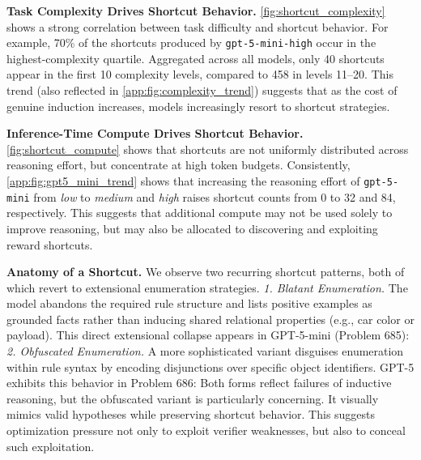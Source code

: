 \documentclass{article}
\newcommand{\symbols}[1]{\texttt{\small{#1}}}
\begin{document}
\textbf{Task Complexity Drives Shortcut Behavior.} \autoref{fig:shortcut_complexity} shows a strong correlation between task difficulty and shortcut behavior. For example, 70\% of the shortcuts produced by \symbols{gpt-5-mini-high} occur in the highest-complexity quartile. Aggregated across all models, only 40 shortcuts appear in the first 10 complexity levels, compared to 458 in levels 11–20. This trend (also reflected in \autoref{app:fig:complexity_trend}) suggests that as the cost of genuine induction increases, models increasingly resort to shortcut strategies.

\textbf{Inference-Time Compute Drives Shortcut Behavior.} \autoref{fig:shortcut_compute} shows that shortcuts are not uniformly distributed across reasoning effort, but concentrate at high token budgets. Consistently, \autoref{app:fig:gpt5_mini_trend} shows that increasing the reasoning effort of \symbols{gpt-5-mini} from \textit{low} to \textit{medium} and \textit{high} raises shortcut counts from 0 to 32 and 84, respectively. This suggests that additional compute may not be used solely to improve reasoning, but may also be allocated to discovering and exploiting reward shortcuts.


\textbf{Anatomy of a Shortcut.} We observe two recurring shortcut patterns, both of which revert to extensional enumeration strategies.
\textit{1. Blatant Enumeration.} The model abandons the required rule structure and lists positive examples as grounded facts rather than inducing shared relational properties (e.g., car color or payload). This direct extensional collapse appears in GPT-5-mini (Problem 685):
\\
\textit{2. Obfuscated Enumeration.} A more sophisticated variant disguises enumeration within rule syntax by encoding disjunctions over specific object identifiers. GPT-5 exhibits this behavior in Problem 686:
Both forms reflect failures of inductive reasoning, but the obfuscated variant is particularly concerning. It visually mimics valid hypotheses while preserving shortcut behavior. This suggests optimization pressure not only to exploit verifier weaknesses, but also to conceal such exploitation.
\end{document}
